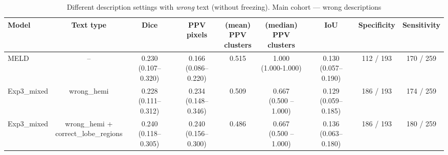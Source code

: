 \documentclass[a4paper,12pt]{article}
\begin{document}
\begin{table}[h]
\centering
\tiny
\caption{Different description settings with \emph{wrong} text (without freezing). Main cohort — wrong descriptions}
\label{tab:wrong_main_cohort_mix_no_freeze}
\begin{tabular}{lcccccccc}
\textbf{Model} &
\textbf{Text type} &
\textbf{Dice} &
\makecell{\textbf{PPV}\\\textbf{pixels}} &
\makecell{\textbf{(mean)} \\\textbf{PPV} \\\textbf{clusters}} & \makecell{\textbf{(median)} \\\textbf{PPV} \\\textbf{clusters}} & 
\textbf{IoU} & 
\textbf{Specificity} &
\textbf{Sensitivity} \\
\hline
MELD & -- &
\makecell{\colorbox{orange!20}{0.230}\\(0.107--0.320)} &
\makecell{0.166\\(0.086--0.220)} &
0.515 &
\makecell{1.000 \\ (1.000-1.000)} &
\makecell{\colorbox{orange!20}{0.130}\\(0.057--0.190)} &
112 / 193 &
170 / 259 \\
\hline
Exp3\_mixed & wrong\_hemi &
\makecell{0.228 \\ (0.111--0.312)} &
\makecell{\colorbox{orange!20}{0.234} \\ (0.148--0.346)} &
0.509 &
\makecell{0.667 \\ (0.500 -- 1.000)} &
\makecell{0.129 \\ (0.059--0.185)} &
186 / 193 &
\colorbox{orange!20}{174 / 259} \\
\hline
Exp3\_mixed & 
\makecell{wrong\_hemi + \\ correct\_lobe\_regions} &
\makecell{\colorbox{green!20}{0.240} \\ (0.118--0.305)} &
\makecell{\colorbox{blue!20}{0.240} \\ (0.156--0.300)} &
0.486 &
\makecell{0.667 \\ (0.500 -- 1.000)} &
\makecell{\colorbox{green!20}{0.136} \\ (0.063--0.180)} &
186 / 193 &
\colorbox{green!20}{180 / 259} \\


\end{tabular}
\end{table}
\end{document}
